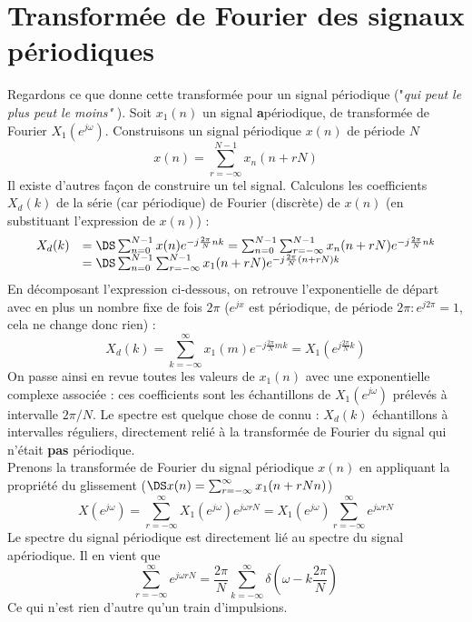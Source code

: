 \section{Transformée de Fourier des signaux périodiques}
Regardons ce que donne cette transformée pour un signal périodique ("\textit{qui peut le plus peut 
le moins" }). Soit $x_1(n)$ un signal \textbf{a}périodique, de transformée de Fourier $X_1(e^{j\omega})$.
Construisons un signal périodique $x(n)$ de période $N$ 
\begin{equation}
x(n) = \sum_{r=-\infty}^{N-1} x_n(n+rN)
\end{equation}
Il existe d'autres façon de construire un tel signal. Calculons les coefficients $X_d(k)$ de la 
série (car périodique) de Fourier (discrète) de $x(n)$ (en substituant l'expression de $x(n)$) :
\begin{equation}
\begin{array}{ll}
X_d(k) &=\DS \sum_{n=0}^{N-1} x(n) e^{-j\frac{2\pi}{N}nk} = \sum_{n=0}^{N-1}\sum_{r=-\infty}^{N-1} x_n(n+rN)
 e^{-j\frac{2\pi}{N}nk}\\
 &=\DS \sum_{n=0}^{N-1}\sum_{r=-\infty}^{N-1} x_1(n+rN) e^{-j\frac{2\pi}{N}(n+rN)k}
 \end{array}
\end{equation}
En décomposant l'expression ci-dessous, on retrouve l'exponentielle de départ avec en plus un
nombre fixe de fois $2\pi$ ($e^{jx}$ est périodique, de période $2\pi : e^{j2\pi}=1$, cela ne 
change donc rien) :
\begin{equation}
X_d(k) = \sum_{k=-\infty}^\infty x_1(m)e^{-j\frac{2\pi}{N}mk} = X_1(e^{j\frac{2\pi}{N}k})
\end{equation}
On passe ainsi en revue toutes les valeurs de $x_1(n)$ avec une exponentielle complexe associée : 
ces coefficients sont les échantillons de $X_1(e^{j\omega})$ prélevés à intervalle $2\pi/N$. Le 
spectre est quelque chose de connu : $X_d(k)$ échantillons à intervalles réguliers, directement 
relié à la transformée de Fourier du signal qui n'était \textbf{pas} périodique.\\

Prenons la transformée de Fourier du signal périodique $x(n)$ en appliquant la propriété du 
glissement ($\DS x(n) = \sum_{r=-\infty}^\infty x_1(n+rNn)$)
\begin{equation}
X(e^{j\omega}) = \sum_{r=-\infty}^\infty X_1(e^{j\omega})e^{j\omega rN} = X_1(e^{j\omega})\sum_{
r=-\infty}^\infty e^{j\omega rN}
\end{equation}
Le spectre du signal périodique est directement lié au spectre du signal apériodique. Il en vient que
\begin{equation}
\sum_{r=-\infty}^\infty e^{j\omega rN} = \dfrac{2\pi}{N}\sum_{k=-\infty}^\infty \delta\left(
\omega-k\dfrac{2\pi}{N}\right)
\end{equation}
Ce qui n'est rien d'autre qu'un train d'impulsions.








